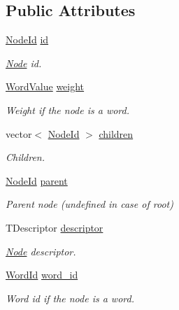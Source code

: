 \subsection*{Public Attributes}
\begin{DoxyCompactItemize}
\item 
\mbox{\hyperlink{namespace_d_bo_w2_a3a0fa9c50c0df508759362d6204566f2}{Node\+Id}} \mbox{\hyperlink{struct_d_bo_w2_1_1_templated_vocabulary_1_1_node_a62fb0c85332741c114110463252c64e9}{id}}
\begin{DoxyCompactList}\small\item\em \mbox{\hyperlink{struct_d_bo_w2_1_1_templated_vocabulary_1_1_node}{Node}} id. \end{DoxyCompactList}\item 
\mbox{\hyperlink{namespace_d_bo_w2_a55fcd7333e591a38e96b91f41bc182f6}{Word\+Value}} \mbox{\hyperlink{struct_d_bo_w2_1_1_templated_vocabulary_1_1_node_ae1e261135cb7af400f1c4c4795cdba41}{weight}}
\begin{DoxyCompactList}\small\item\em Weight if the node is a word. \end{DoxyCompactList}\item 
vector$<$ \mbox{\hyperlink{namespace_d_bo_w2_a3a0fa9c50c0df508759362d6204566f2}{Node\+Id}} $>$ \mbox{\hyperlink{struct_d_bo_w2_1_1_templated_vocabulary_1_1_node_a0305ad0a8964947347da1d38ef0363ed}{children}}
\begin{DoxyCompactList}\small\item\em Children. \end{DoxyCompactList}\item 
\mbox{\hyperlink{namespace_d_bo_w2_a3a0fa9c50c0df508759362d6204566f2}{Node\+Id}} \mbox{\hyperlink{struct_d_bo_w2_1_1_templated_vocabulary_1_1_node_a082fba9dcf272b78354ffd5b1d58f5fa}{parent}}
\begin{DoxyCompactList}\small\item\em Parent node (undefined in case of root) \end{DoxyCompactList}\item 
T\+Descriptor \mbox{\hyperlink{struct_d_bo_w2_1_1_templated_vocabulary_1_1_node_ab785e994eeae8e6c1d67ee45ad4c8450}{descriptor}}
\begin{DoxyCompactList}\small\item\em \mbox{\hyperlink{struct_d_bo_w2_1_1_templated_vocabulary_1_1_node}{Node}} descriptor. \end{DoxyCompactList}\item 
\mbox{\hyperlink{namespace_d_bo_w2_ab1a0d3283b2d4690a383372ed20bfeb5}{Word\+Id}} \mbox{\hyperlink{struct_d_bo_w2_1_1_templated_vocabulary_1_1_node_aa56418d848932be4583fac6b3021c708}{word\+\_\+id}}
\begin{DoxyCompactList}\small\item\em Word id if the node is a word. \end{DoxyCompactList}\end{DoxyCompactItemize}


